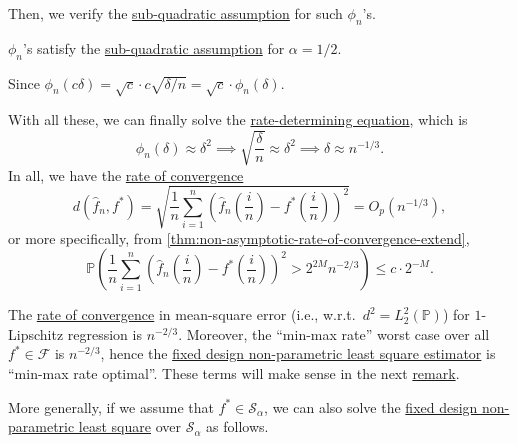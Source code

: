 Then, we verify the \hyperref[def:sub-quadratic-assumption]{sub-quadratic assumption} for such \(\phi _n\)'s.

\begin{claim}
	\(\phi _n\)'s satisfy the \hyperref[def:sub-quadratic-assumption]{sub-quadratic assumption} for \(\alpha = 1 / 2\).
\end{claim}
\begin{explanation}
	Since \(\phi _n (c \delta ) = \sqrt{c} \cdot c \sqrt{\delta / n} = \sqrt{c} \cdot \phi _n(\delta )\).
\end{explanation}

With all these, we can finally solve the \hyperref[def:rate-determining-equation]{rate-determining equation}, which is
\[
	\phi _n (\delta ) \approx \delta ^2
	\implies \sqrt{\frac{\delta}{n}} \approx \delta ^2
	\implies \delta \approx n^{-1 / 3}.
\]
In all, we have the \hyperref[def:rate-of-convergence]{rate of convergence}
\[
	d(\hat{f} _n, f^{\ast} )
	= \sqrt{\frac{1}{n} \sum_{i=1}^{n} \left( \hat{f} _n \left( \frac{i}{n} \right) - f^{\ast} \left( \frac{i}{n} \right)   \right) ^2 }
	= O_p(n^{-1 / 3}) ,
\]
or more specifically, from \autoref{thm:non-asymptotic-rate-of-convergence-extend},
\[
	\mathbb{P} \left( \frac{1}{n} \sum_{i=1}^{n} \left( \hat{f} _n \left( \frac{i}{n} \right) - f^{\ast} \left( \frac{i}{n} \right) \right) ^2 > 2^{2M} n^{-2 / 3} \right) \leq c\cdot 2^{-M}.
\]

\begin{remark}
	The \hyperref[def:rate-of-convergence]{rate of convergence} in mean-square error (i.e., w.r.t.\ \(d^2 = L_2^2(\mathbb{P} )\)) for \(1\)-Lipschitz regression is \(n^{-2 / 3}\). Moreover, the ``min-max rate'' worst case over all \(f^{\ast} \in \mathscr{F} \) is \(n^{-2 / 3}\), hence the \hyperref[prb:fixed-design-non-parametric-LS]{fixed design non-parametric least square estimator} is ``min-max rate optimal''. These terms will make sense in the next \hyperref[rmk:min-max-rate-optimal]{remark}.
\end{remark}

More generally, if we assume that \(f^{\ast} \in \mathcal{S} _{\alpha }\), we can also solve the \hyperref[prb:fixed-design-non-parametric-LS]{fixed design non-parametric least square} over \(\mathcal{S} _\alpha \) as follows.

